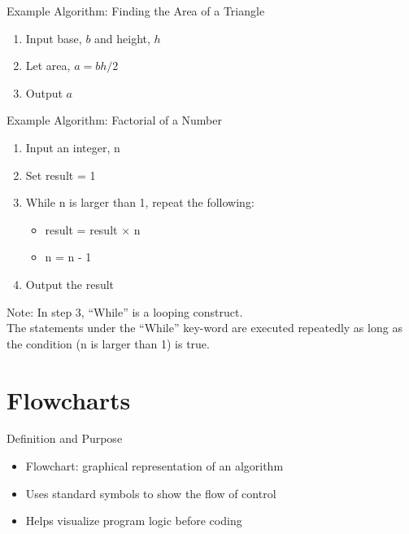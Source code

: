 \documentclass[12pt, aspectratio=169]{beamer}
\begin{document}
    \begin{frame}{Example Algorithm: Finding the Area of a Triangle}
        \begin{enumerate}
            \item Input base, $b$ and height, $h$
            \item Let area, $a = bh/2$
            \item Output $a$
        \end{enumerate}
    \end{frame}


    \begin{frame}{Example Algorithm: Factorial of a Number}
        \begin{enumerate}
            \item Input an integer, n
            \item Set result = 1
            \item While n is larger than 1, repeat the following:
            \begin{itemize}
                \item result = result × n
                \item n = n - 1
            \end{itemize}
            \item Output the result
        \end{enumerate}
        
        \vspace{1em}

        Note: In step 3, ``While'' is a looping construct.\\
        
        The statements under the ``While'' key-word are executed repeatedly as long as the condition (n is larger than 1) is true.
    \end{frame}


    \section{Flowcharts}


    \begin{frame}{Definition and Purpose}
        \begin{itemize}
            \item Flowchart: graphical representation of an algorithm
            \item Uses standard symbols to show the flow of control
            \item Helps visualize program logic before coding
        \end{itemize}
    \end{frame}
\end{document}
